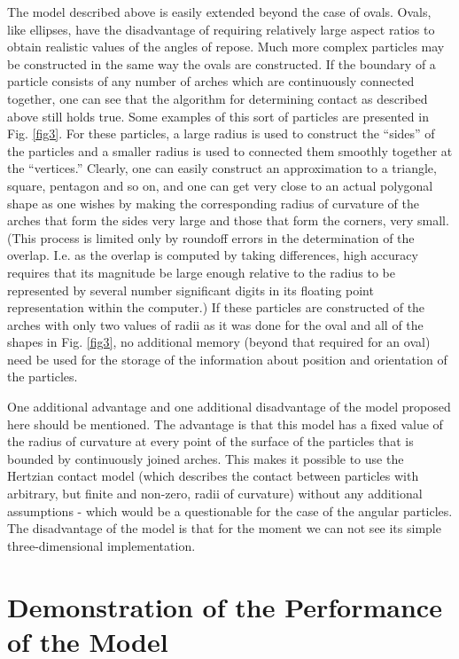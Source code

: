 \documentclass[granma]{svjour}
\begin{document}
The model described above is easily extended beyond the case of ovals. Ovals,
like ellipses, have the disadvantage of requiring relatively large aspect
ratios to obtain realistic values of the angles of repose. Much more
complex particles may be constructed in the same way the ovals are
constructed. If the boundary of a particle consists of any number of arches
which are continuously connected together, one can see that the algorithm for
determining contact as described above still holds true. Some examples of
this sort of particles are presented in Fig. \ref{fig3}. For these
particles, a large
radius is used to construct the ``sides'' of the particles and a smaller
radius is used to connected them smoothly together at the ``vertices.''
Clearly, one can easily construct an approximation to a triangle, square,
pentagon and so on, and one can get very close to an actual polygonal shape
as one wishes by making the corresponding radius of curvature of the arches
that form the sides very large and those that form the corners, very small.
(This process is limited only by roundoff errors in the determination of the
overlap. I.e. as the overlap is computed by taking differences, high accuracy
requires that its magnitude be large enough relative to the radius to be
represented by several number significant digits in its floating point
representation within the computer.) If these particles are constructed of
the arches with only two values of radii as it was done for the oval and all
of the shapes in Fig. \ref{fig3}, no additional memory (beyond that
required for an
oval) need be used for the storage of the information about position and
orientation of the particles.

One additional advantage and one additional disadvantage of the model
proposed here should be mentioned. The advantage is that this model has a
fixed value of the radius of curvature at every point of the surface of the
particles that is bounded by continuously joined arches. This makes it
possible to use the Hertzian contact model (which describes the contact
between particles with arbitrary, but finite and non-zero, radii of
curvature) without any additional assumptions - which would be a questionable
for the case of the angular particles. The disadvantage of the model is that
for the moment we can not see its simple three-dimensional implementation.


\section{Demonstration of the Performance of the Mo\-del}
\end{document}
